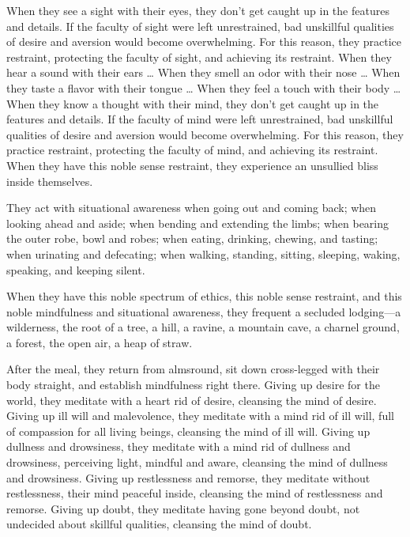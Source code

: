 \documentclass[12pt,openany]{book}%
\begin{document}
When they see a sight with their eyes, they don’t get caught up in the features and details. If the faculty of sight were left unrestrained, bad unskillful qualities of desire and aversion would become overwhelming. For this reason, they practice restraint, protecting the faculty of sight, and achieving its restraint. When they hear a sound with their ears … When they smell an odor with their nose … When they taste a flavor with their tongue … When they feel a touch with their body … When they know a thought with their mind, they don’t get caught up in the features and details. If the faculty of mind were left unrestrained, bad unskillful qualities of desire and aversion would become overwhelming. For this reason, they practice restraint, protecting the faculty of mind, and achieving its restraint. When they have this noble sense restraint, they experience an unsullied bliss inside themselves. 

They act with situational awareness when going out and coming back; when looking ahead and aside; when bending and extending the limbs; when bearing the outer robe, bowl and robes; when eating, drinking, chewing, and tasting; when urinating and defecating; when walking, standing, sitting, sleeping, waking, speaking, and keeping silent. 

When they have this noble spectrum of ethics, this noble sense restraint, and this noble mindfulness and situational awareness, they frequent a secluded lodging—a wilderness, the root of a tree, a hill, a ravine, a mountain cave, a charnel ground, a forest, the open air, a heap of straw. 

After the meal, they return from almsround, sit down cross-legged with their body straight, and establish mindfulness right there. Giving up desire for the world, they meditate with a heart rid of desire, cleansing the mind of desire. Giving up ill will and malevolence, they meditate with a mind rid of ill will, full of compassion for all living beings, cleansing the mind of ill will. Giving up dullness and drowsiness, they meditate with a mind rid of dullness and drowsiness, perceiving light, mindful and aware, cleansing the mind of dullness and drowsiness. Giving up restlessness and remorse, they meditate without restlessness, their mind peaceful inside, cleansing the mind of restlessness and remorse. Giving up doubt, they meditate having gone beyond doubt, not undecided about skillful qualities, cleansing the mind of doubt. 
\end{document}
